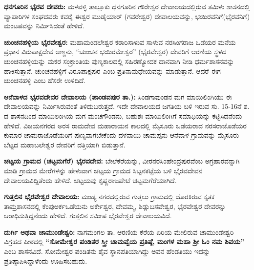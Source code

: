 \textbf{ಧನಗೂರಿನ ಭೈರವ ದೇವರು: } ಮಳವಳ್ಳಿ ತಾಲ್ಲೂಕು ಧನಗೂರಿನ ಗೌರೇಶ್ವರ ದೇವಾಲಯದಲ್ಲಿರುವ ತಮಿಳು ಶಾಸನದಲ್ಲಿ ವ್ಯಾಪಾರಿಗಳ ಸಂಘದವರು ಕವರೈ ಈಶ್ವರ ಮುಡೈಯಾರ್​ (ಗವರೇಶ್ವರ) ದೇವಾಲಯವನ್ನು, ಭಯಿರವ\-ನಿಗೆ(ಭೈರವನಿಗೆ) ಮಂಟಪವನ್ನು ನಿರ್ಮಿಸಿದಂತೆ ಹೇಳಿದೆ.

\textbf{ಚುಂಚನಹಳ್ಳಿಯ ಭೈರವೇಶ್ವರ:} ಮಹಾಮಂಡಲೇಶ್ವರ ಕಠಾರಿಸಾಳುವ ಸಾಳುವ ನರಸಿಂಗರಾಜ ಒಡೆಯರ ಮನೆಯ ಪ್ರಧಾನ ವಿರುಪಾಕ್ಷದೇವ ಅಣ್ಣನು, “ಚುಂಚನ ಭಯಿರಮೇಶ್ವರ” (ಭೈರವೇಶ್ವರ) ದೇವರಿಗೆ ಆರಣಿಯ ಸ್ಥಳದ ಚುಂಚನಹಳ್ಳಿ\-ಯನ್ನು ಮಕರ ಸಂಕ್ರಾಂತಿಯ ಪುಣ್ಯಕಾಲದಲ್ಲಿ ಸಹಿರಣ್ಯೋದಕ ದಾನವಾಗಿ ನೀಡಿ ಧರ್ಮಶಾಸನವನ್ನು ಹಾಕಿಸುತ್ತಾನೆ. ಚುಂಚನಹಳ್ಳಿಗೆ ವಿರೂಪಾಕ್ಷಪುರ ಎಂಬ ಪ್ರತಿನಾಮಧೇಯವನ್ನು ಮಾಡುತ್ತಾನೆ. ಆದರೆ ಈಗ ಚುಂಚನಹಳ್ಳಿ ಎಂಬ ಹೆಸರೇ ಉಳಿದಿದೆ.

\textbf{ಆನೆವಾಳದ ಭೈರವದೇವರ ದೇವಾಲಯ (ಪಾಂಡವಪುರ ತಾ.):} ಸಿಂಡಗಾವುಂಡನ ಮಗ ಮಾಯಿಲಿಂಗಿಯು ಈ ದೇವಾಲಯವನ್ನು ನಿರ್ಮಿಸಿರುವಂತೆ ತಿಳಿದುಬರುತ್ತದೆ. ಇದೇ ದೇವಾಲಯದ ಜಗತಿಯ ಬಳಿ ಇರುವ ಸು. 15-16ನೆ ಶ. ದ ಶಾಸನದಿಂದ ಮಾಯಿಲಂಗಿಯ ಮಗ ಮಂಚಗೌಂಡನು, ಬಹುಶಃ ಮಾಯಿಲಿಂಗಿಗೆ ಸಮಾಧಿಯನ್ನು ಕಟ್ಟಿಸಿದನೆಂದು ಹೇಳಿದೆ. ವಿಜಯನಗರದ ಅರಸ ರಾಮದೇವ ಮಹಾರಾಯನ ಕಾಲದಲ್ಲಿ ಮೈಸೂರು ಒಡೆಯರಾದ ನರಸರಾಜೊಡೆಯರ ಕುಮಾರ ಚಾಮರಾಜೊಡೆಯರಿಗೆ ಪುಣ್ಯವಾಗಬೇಕೆಂದು ದಳವಾಯಿ ಚಾಮಪ್ಪನು ಆನೆವಾಳ ಗ್ರಾಮವನ್ನು ಮೈಸೂರು ಬೆಟ್ಟದ ಮಹಾಬಲೇಶ್ವರ ದೇವರಿಗೆ ದತ್ತಿಯಾಗಿ ಬಿಡುತ್ತಾನೆ.

\textbf{ಚಟ್ಟಯ ಗ್ರಾಮದ (ಚಟ್ಟಮಗೆರೆ) ಭೈರವದೇವ:} ಬೇಲೆಕೆರೆಯನ್ನು, ವೀರನರಸಿಂಹೇಂದ್ರಪುರವೆಂಬ ಅಗ್ರಹಾರವನ್ನಾಗಿ ಮಾಡಿ ಗ್ರಾಮದ ಮೇರೆಗಳನ್ನು ಹೇಳುವಾಗ ಚಟ್ಟಯ ಗ್ರಾಮದ ಸಿಬ್ಬನಕಟ್ಟೆಯ ಬಳಿ ಭೈರವದೇವನ ದೇವಾಲಯವಿದ್ದಿತೆಂದು ಹೇಳಿದೆ. ಚಟ್ಟಯವು ಕೃಷ್ಣರಾಜಪೇಟೆ ಚಟ್ಟಮಗೆರೆಯಾಗಿದೆ.

\textbf{ಗುತ್ತಲಿನ ಭೈರವೇಶ್ವರ ದೇವಾಲಯ:} ಮಂಡ್ಯ ನಗರದಲ್ಲಿರುವ ಗುತ್ತಲು ಗ್ರಾಮದಲ್ಲಿ ದೊರಕಿರುವ ಕೃತಕ ತಾಮ್ರಶಾಸನದಲ್ಲಿ ಕೆಂಪುಅರ್ಕಒಡೆಯನು ಅರ್ಕೇಶ್ವರ, ದೇವಮ್ಮ, ಶಿಡ್ಲುಬಸವೇಶ್ವರ, ಭೈರವೇಶ್ವರ ದೇವರನ್ನು ಆರಾಧಿಸುತ್ತಿದ್ದ\-ನೆಂದು ಹೇಳಿದೆ. ಗುತ್ತಲಿನ ಸಮೀಪ ಭೈರವೇಶ್ವರ ದೇವಾಲಯವಿದೆ.

\textbf{ದುರ್ಗಿ ಅಥವಾ ಚಾಮುಂಡೇಶ್ವರಿ:} ನಾಗಮಂಗಲ ತಾ. ಆರಣಿಯ ಕೆರೆಯ ಏರಿಯ ಮೇಲಿರುವ ಚಾಮುಂಡೇಶ್ವರಿ ವಿಗ್ರಹದ ಪೀಠದಲ್ಲಿ \textbf{“ಸೋಮೇಶ್ವರ ಪಂಡಿತರ ಸ್ತ್ರೀ ಚಾಮವ್ವೆಯ ಪ್ರತಿಷ್ಠೆ, ಮಂಗಳ ಮಹಾ ಶ‍್ರೀ ಓಂ ನಮ ಶಿವಯ”} ಎಂಬ ಶಾಸನವಿದೆ. ಸೋಮೇಶ್ವರ ಪಂಡಿತನು ಶೈವ ಸ್ಥಾನಪತಿಯಾಗಿದ್ದು ಅವನ ಹೆಂಡತಿಯು ಇದನ್ನು ಪ್ರತಿಷ್ಠಾಪಿಸಿದ್ದಾಳೆಂದು ಊಹಿಸಬಹುದು.


